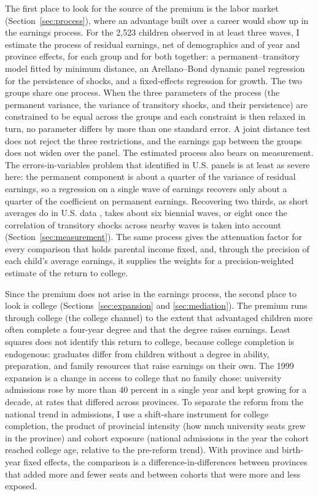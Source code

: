 \documentclass[11pt]{article}
\begin{document}
The first place to look for the source of the premium is the labor market (Section~\ref{sec:process}), where an advantage built over a career would show up in the earnings process. For the 2,523 children observed in at least three waves, I estimate the process of residual earnings, net of demographics and of year and province effects, for each group and for both together: a permanent--transitory model fitted by minimum distance, an Arellano--Bond dynamic panel regression for the persistence of shocks, and a fixed-effects regression for growth. The two groups share one process. When the three parameters of the process (the permanent variance, the variance of transitory shocks, and their persistence) are constrained to be equal across the groups and each constraint is then relaxed in turn, no parameter differs by more than one standard error. A joint distance test does not reject the three restrictions, and the earnings gap between the groups does not widen over the panel. The estimated process also bears on measurement. The errors-in-variables problem that \citet{Solon1992} identified in U.S. panels is at least as severe here: the permanent component is about a quarter of the variance of residual earnings, so a regression on a single wave of earnings recovers only about a quarter of the coefficient on permanent earnings. Recovering two thirds, as short averages do in U.S. data \citep{Mazumder2005}, takes about six biennial waves, or eight once the correlation of transitory shocks across nearby waves is taken into account (Section~\ref{sec:measurement}). The same process gives the attenuation factor for every comparison that holds parental income fixed, and, through the precision of each child's average earnings, it supplies the weights for a precision-weighted estimate of the return to college.

Since the premium does not arise in the earnings process, the second place to look is college (Sections~\ref{sec:expansion} and \ref{sec:mediation}). The premium runs through college (the college channel) to the extent that advantaged children more often complete a four-year degree and that the degree raises earnings. Least squares does not identify this return to college, because college completion is endogenous: graduates differ from children without a degree in ability, preparation, and family resources that raise earnings on their own. The 1999 expansion is a change in access to college that no family chose: university admissions rose by more than 40 percent in a single year and kept growing for a decade, at rates that differed across provinces. To separate the reform from the national trend in admissions, I use a shift-share instrument for college completion, the product of provincial intensity (how much university seats grew in the province) and cohort exposure (national admissions in the year the cohort reached college age, relative to the pre-reform trend). With province and birth-year fixed effects, the comparison is a difference-in-differences between provinces that added more and fewer seats and between cohorts that were more and less exposed.
\end{document}
